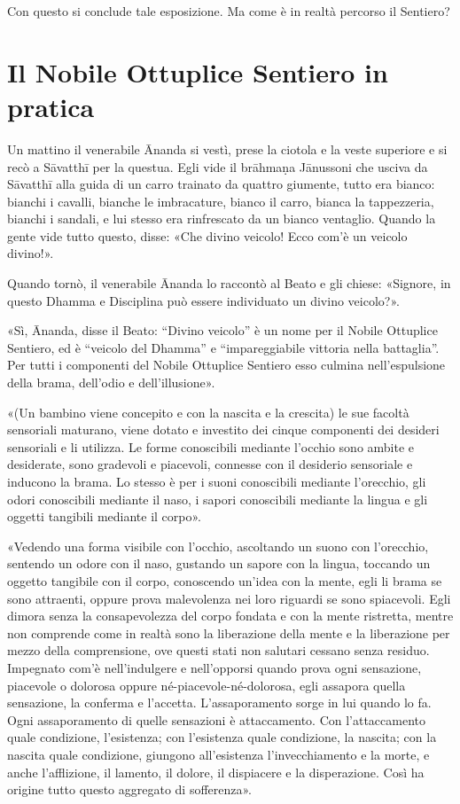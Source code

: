 
 Con questo si conclude tale esposizione. Ma come è
in realtà percorso il Sentiero?

\section*{Il Nobile Ottuplice Sentiero in pratica}

\label{pag281}%
 Un mattino il venerabile Ānanda si vestì, prese la ciotola e
la veste superiore e si recò a Sāvatthī per la questua. Egli vide il brāhmaṇa
Jānussoni che usciva da Sāvatthī alla guida di un carro trainato da quattro
giumente, tutto era bianco: bianchi i cavalli, bianche le imbracature, bianco il
carro, bianca la tappezzeria, bianchi i sandali, e lui stesso era rinfrescato da
un bianco ventaglio. Quando la gente vide tutto questo, disse: «Che divino
veicolo! Ecco com’è un veicolo divino!».

Quando tornò, il venerabile Ānanda lo raccontò al Beato e gli chiese: «Signore,
in questo Dhamma e Disciplina può essere individuato un divino veicolo?».

«Sì, Ānanda, disse il Beato: “Divino veicolo” è un nome per il Nobile Ottuplice
Sentiero, ed è “veicolo del Dhamma” e “impareggiabile vittoria nella battaglia”.
Per tutti i componenti del Nobile Ottuplice Sentiero esso culmina
nell’espulsione della brama, dell’odio e dell’illusione».


«(Un bambino viene concepito e con la nascita e la crescita) le sue facoltà
sensoriali maturano, viene dotato e investito dei cinque componenti dei desideri
sensoriali e li utilizza. Le forme conoscibili mediante l’occhio sono ambite e
desiderate, sono gradevoli e piacevoli, connesse con il desiderio sensoriale e
inducono la brama. Lo stesso è per i suoni conoscibili mediante l’orecchio, gli
odori conoscibili mediante il naso, i sapori conoscibili mediante la lingua e
gli oggetti tangibili mediante il corpo».

«Vedendo una forma visibile con l’occhio, ascoltando un suono con l’orecchio,
sentendo un odore con il naso, gustando un sapore con la lingua, toccando un
oggetto tangibile con il corpo, conoscendo un’idea con la mente, egli li brama
se sono attraenti, oppure prova malevolenza nei loro riguardi se sono
spiacevoli. Egli dimora senza la consapevolezza del corpo fondata e con la mente
ristretta, mentre non comprende come in realtà sono la liberazione della mente e
la liberazione per mezzo della comprensione, ove questi stati non salutari
cessano senza residuo. Impegnato com’è nell’indulgere e nell’opporsi quando
prova ogni sensazione, piacevole o dolorosa oppure né-piacevole-né-dolorosa,
egli assapora quella sensazione, la conferma e l’accetta. L’assaporamento sorge
in lui quando lo fa. Ogni assaporamento di quelle sensazioni è attaccamento. Con
l’attaccamento quale condizione, l’esistenza; con l’esistenza quale condizione,
la nascita; con la nascita quale condizione, giungono all’esistenza
l’invecchiamento e la morte, e anche l’afflizione, il lamento, il dolore, il
dispiacere e la disperazione. Così ha origine tutto questo aggregato di
sofferenza».

